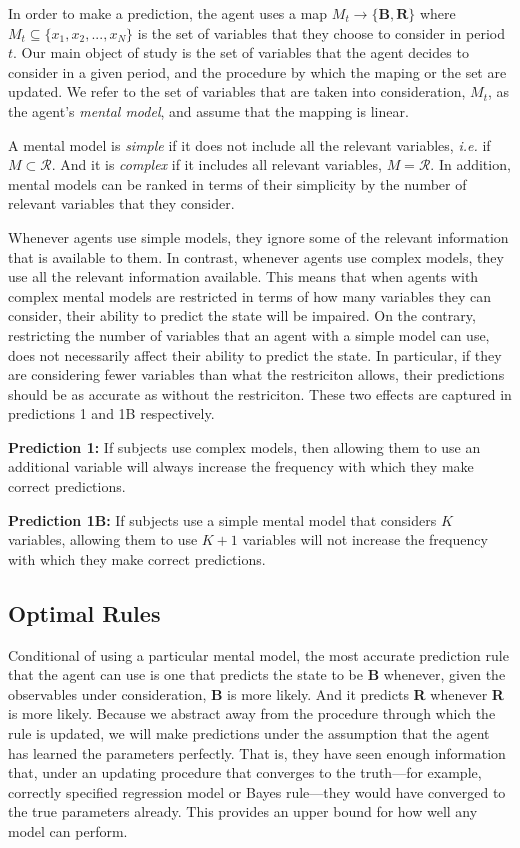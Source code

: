 \documentclass[
  12pt,
]{article}
\begin{document}
In order to make a prediction, the agent uses a map
\(M_t\to \{\textbf{B}, \textbf{R}\}\) where
\(M_t \subseteq \{x_1, x_2, ..., x_N\}\) is the set of variables that
they choose to consider in period \(t\). Our main object of study is the
set of variables that the agent decides to consider in a given period,
and the procedure by which the maping or the set are updated. We refer
to the set of variables that are taken into consideration, \(M_t\), as
the agent's \emph{mental model}, and assume that the mapping is linear.

A mental model is \emph{simple} if it does not include all the relevant
variables, \emph{i.e.} if \(M\subset \mathcal{R}\). And it is
\emph{complex} if it includes all relevant variables, \(M=\mathcal{R}\).
In addition, mental models can be ranked in terms of their simplicity by
the number of relevant variables that they consider.

Whenever agents use simple models, they ignore some of the relevant
information that is available to them. In contrast, whenever agents use
complex models, they use all the relevant information available. This
means that when agents with complex mental models are restricted in
terms of how many variables they can consider, their ability to predict
the state will be impaired. On the contrary, restricting the number of
variables that an agent with a simple model can use, does not
necessarily affect their ability to predict the state. In particular, if
they are considering fewer variables than what the restriciton allows,
their predictions should be as accurate as without the restriciton.
These two effects are captured in predictions 1 and 1B respectively.

\textbf{Prediction 1:} If subjects use complex models, then allowing
them to use an additional variable will always increase the frequency
with which they make correct predictions.

\textbf{Prediction 1B:} If subjects use a simple mental model that
considers \(K\) variables, allowing them to use \(K+1\) variables will
not increase the frequency with which they make correct predictions.

\hypertarget{optimal-rules}{%
\subsection{Optimal Rules}\label{optimal-rules}}

Conditional of using a particular mental model, the most accurate
prediction rule that the agent can use is one that predicts the state to
be \textbf{B} whenever, given the observables under consideration,
\textbf{B} is more likely. And it predicts \textbf{R} whenever
\textbf{R} is more likely. Because we abstract away from the procedure
through which the rule is updated, we will make predictions under the
assumption that the agent has learned the parameters perfectly. That is,
they have seen enough information that, under an updating procedure that
converges to the truth---for example, correctly specified regression
model or Bayes rule---they would have converged to the true parameters
already. This provides an upper bound for how well any model can
perform.
\end{document}
